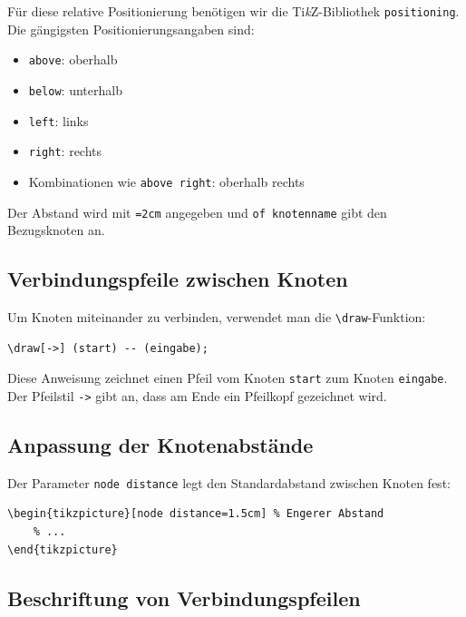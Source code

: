 Für diese relative Positionierung benötigen wir die Ti\textit{k}Z-Bibliothek \texttt{positioning}. Die gängigsten Positionierungsangaben sind:
\begin{itemize}
    \item \texttt{above}: oberhalb
    \item \texttt{below}: unterhalb
    \item \texttt{left}: links
    \item \texttt{right}: rechts
    \item Kombinationen wie \texttt{above right}: oberhalb rechts
\end{itemize}

Der Abstand wird mit \texttt{=2cm} angegeben und \texttt{of knotenname} gibt den Bezugsknoten an.



\subsection{Verbindungspfeile zwischen Knoten}

Um Knoten miteinander zu verbinden, verwendet man die \texttt{\textbackslash draw}-Funktion:

\begin{lstlisting}[style=latex]
\draw[->] (start) -- (eingabe);
\end{lstlisting}

Diese Anweisung zeichnet einen Pfeil vom Knoten \texttt{start} zum Knoten \texttt{eingabe}. Der Pfeilstil \texttt{->} gibt an, dass am Ende ein Pfeilkopf gezeichnet wird.



\subsection{Anpassung der Knotenabstände}

Der Parameter \texttt{node distance} legt den Standardabstand zwischen Knoten fest:

\begin{lstlisting}[style=latex]
\begin{tikzpicture}[node distance=1.5cm] % Engerer Abstand
	% ...
\end{tikzpicture}
\end{lstlisting}



\subsection{Beschriftung von Verbindungspfeilen}

